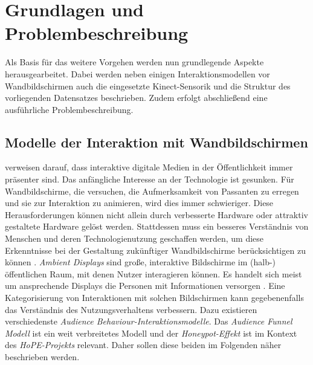 \chapter{Grundlagen und Problembeschreibung}
\label{chapter2}
Als Basis für das weitere Vorgehen
werden nun grundlegende Aspekte herausgearbeitet.
Dabei werden neben einigen Interaktionsmodellen vor Wandbildschirmen
auch die eingesetzte Kinect-Sensorik und die Struktur des vorliegenden Datensatzes beschrieben.
Zudem erfolgt abschließend eine ausführliche Problembeschreibung.

\section{Modelle der Interaktion mit Wandbildschirmen}
\label{2-ModelleInteraktion-Wandbildschirme}
\citet{wouters_uncovering_2016} verweisen darauf, dass interaktive digitale Medien in der Öffentlichkeit immer präsenter sind.
Das anfängliche Interesse an der Technologie ist gesunken.
Für Wandbildschirme, die versuchen, die Aufmerksamkeit von Passanten zu erregen
und sie zur Interaktion zu animieren, wird dies immer schwieriger.
Diese Herausforderungen können nicht allein durch verbesserte Hardware
oder attraktiv gestaltete Hardware gelöst werden.
Stattdessen muss ein besseres Verständnis von Menschen und deren Technologienutzung geschaffen werden,
um diese Erkenntnisse bei der Gestaltung zukünftiger Wandbildschirme berücksichtigen zu können \citep{wouters_uncovering_2016}.
\emph{Ambient Displays} sind große, interaktive Bildschirme im (halb-) öffentlichen Raum, mit denen Nutzer interagieren können.
Es handelt sich meist um ansprechende Displays die Personen mit Informationen versorgen \citep{mankoff_heuristic_2003}.
Eine Kategorisierung von Interaktionen mit solchen Bildschirmen kann gegebenenfalls das Verständnis des Nutzungsverhaltens verbessern.
Dazu existieren verschiedenste \emph{Audience Behaviour-Interaktionsmodelle}.
Das \emph{Audience Funnel Modell} ist ein weit verbreitetes Modell
und der \emph{Honeypot-Effekt} ist im Kontext des \emph{HoPE-Projekts} relevant.
Daher sollen diese beiden im Folgenden näher beschrieben werden.

